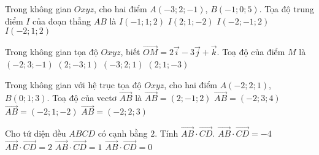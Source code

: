 \begin{ex}%
 Trong không gian $Oxyz$, cho hai điểm $A(-3;2;-1)$, $B(-1;0;5)$. Tọa độ trung điểm $I$ của đoạn thẳng $AB$ là
 \choice
 {$I(-1;1;2)$}
 {$I(2;1;-2)$}
 {$I(-2;-1;2)$}
 {\True $I(-2;1;2)$}
 \end{ex}

\begin{ex}%
 Trong không gian tọa độ $Oxyz$, biết $\overrightarrow{OM}=2\overrightarrow i-3\overrightarrow j+\overrightarrow k$. Toạ độ của điểm $M$ là
 \choice
 {$(-2;3;-1)$}
 {\True $(2;-3;1)$}
 {$(-3;2;1)$}
 {$(2;1;-3)$}
 \end{ex}

\begin{ex}%
 Trong không gian với hệ trục tọa độ $Oxyz$, cho hai điểm $A(-2;2;1)$, $B( 0;1;3)$. Toạ độ của vectơ $\overrightarrow{AB}$ là
 \choice
 {\True $\overrightarrow{AB}=(2;-1;2)$}
 {$\overrightarrow{AB}=(-2;3;4)$}
 {$\overrightarrow{AB}=(-2;1;-2)$}
 {$\overrightarrow{AB}=(-2;2;3)$}
 \end{ex}

\begin{ex}%
 Cho tứ diện đều $ABCD$ có cạnh bằng $2$. Tính $\overrightarrow{AB}\cdot\overrightarrow{CD}$.
 \choice
 {$\overrightarrow{AB}\cdot\overrightarrow{CD}=-4$}
 {$\overrightarrow{AB}\cdot\overrightarrow{CD}=2$}
 {$\overrightarrow{AB}\cdot\overrightarrow{CD}=1$}
 {\True $\overrightarrow{AB}\cdot\overrightarrow{CD}=0$}
 \end{ex}

